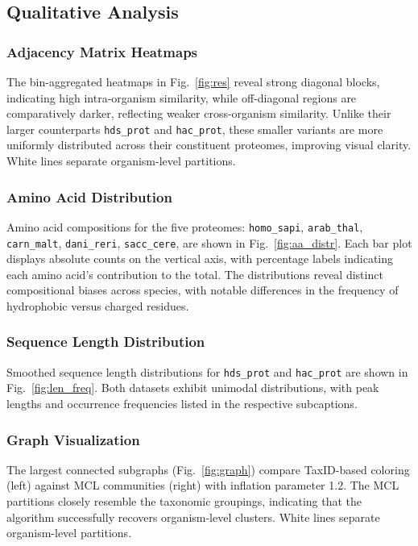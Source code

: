 \subsection{Qualitative Analysis}

\subsubsection*{Adjacency Matrix Heatmaps}

The bin-aggregated heatmaps in Fig.~\ref{fig:res} reveal strong diagonal
blocks, indicating high intra-organism similarity, while off-diagonal regions
are comparatively darker, reflecting weaker cross-organism similarity. Unlike
their larger counterparts \texttt{hds\_prot} and \texttt{hac\_prot}, these
smaller variants are more uniformly distributed across their constituent
proteomes, improving visual clarity. White lines separate organism-level
partitions.

\subsubsection*{Amino Acid Distribution}

Amino acid compositions for the five proteomes: \texttt{homo\_sapi},
\texttt{arab\_thal}, \texttt{carn\_malt}, \texttt{dani\_reri},
\texttt{sacc\_cere}, are shown in Fig.~\ref{fig:aa_distr}. Each bar plot
displays absolute counts on the vertical axis, with percentage labels
indicating each amino acid's contribution to the total. The distributions
reveal distinct compositional biases across species, with notable differences
in the frequency of hydrophobic versus charged residues.

\subsubsection*{Sequence Length Distribution}

Smoothed sequence length distributions for \texttt{hds\_prot} and \texttt{hac\_prot} are shown in Fig.~\ref{fig:len_freq}. Both datasets exhibit unimodal distributions, with peak lengths and occurrence frequencies listed in the respective subcaptions.

\subsubsection*{Graph Visualization}

The largest connected subgraphs (Fig.~\ref{fig:graph}) compare TaxID-based coloring (left) against MCL communities (right) with inflation parameter 1.2. The MCL partitions closely resemble the taxonomic groupings, indicating that the algorithm successfully recovers organism-level clusters. White lines separate organism-level partitions.

